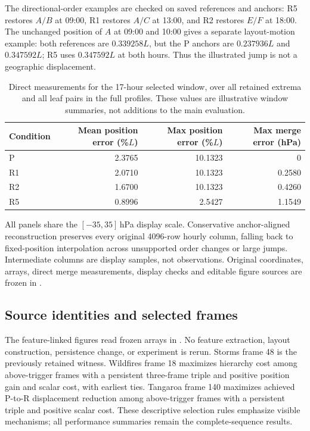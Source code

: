 The directional-order examples are checked on saved references and anchors: R5 restores $A/B$ at 09:00, R1 restores $A/C$ at 13:00, and R2 restores $E/F$ at 18:00. The unchanged position of $A$ at 09:00 and 10:00 gives a separate layout-motion example: both references are $0.339258L$, but the P anchors are $0.237936L$ and $0.347592L$; R5 uses $0.347592L$ at both hours. Thus the illustrated jump is not a geographic displacement.

\begin{table}[H]\centering\small
\caption{Direct measurements for the 17-hour selected window, over all retained extrema and all leaf pairs in the full profiles. These values are illustrative window summaries, not additions to the main evaluation.}
\begin{tabular}{lrrr}\toprule
Condition & Mean position error (\%$L$) & Max position error (\%$L$) & Max merge error (hPa)\\\midrule
P & 2.3765 & 10.1323 & 0\\
R1 & 2.0710 & 10.1323 & 0.2580\\
R2 & 1.6700 & 10.1323 & 0.4260\\
R5 & 0.8996 & 2.5427 & 1.1549\\\bottomrule
\end{tabular}\label{tab:s_hourly_teaser}
\end{table}

All panels share the $[-35,35]$\,hPa display scale. Conservative anchor-aligned reconstruction preserves every original 4096-row hourly column, falling back to fixed-position interpolation across unsupported order changes or large jumps. Intermediate columns are display samples, not observations. Original coordinates, arrays, direct merge measurements, display checks and editable figure sources are frozen in .

\subsection{Source identities and selected frames}
The feature-linked figures read frozen arrays in . No feature extraction, layout construction, persistence change, or experiment is rerun. Storms frame 48 is the previously retained witness. Wildfires frame 18 maximizes hierarchy cost among above-trigger frames with a persistent three-frame triple and positive position gain and scalar cost, with earliest ties. Tangaroa frame 140 maximizes achieved P-to-R displacement reduction among above-trigger frames with a persistent triple and positive scalar cost. These descriptive selection rules emphasize visible mechanisms; all performance summaries remain the complete-sequence results.

